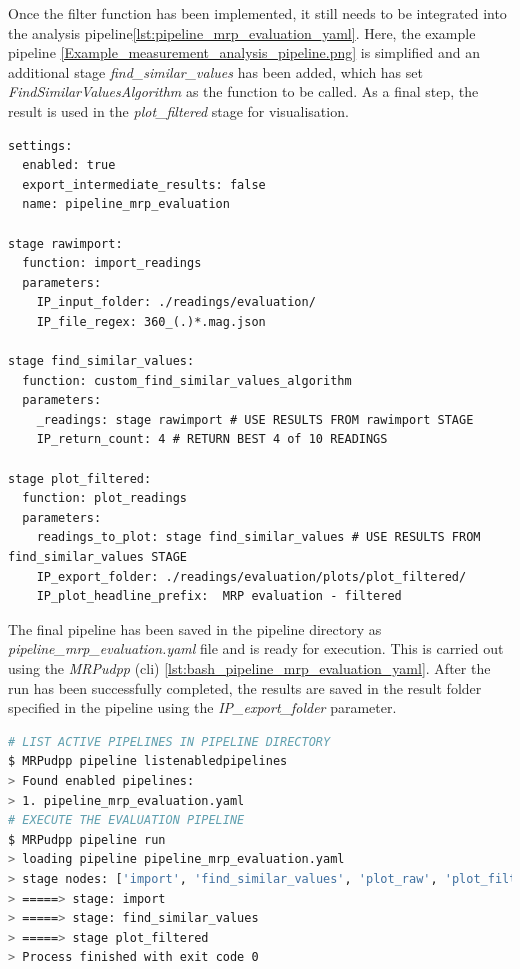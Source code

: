 Once the filter function has been implemented, it still needs to be
integrated into the analysis
pipeline\ref{lst:pipeline_mrp_evaluation_yaml}. Here, the example
pipeline \ref{Example_measurement_analysis_pipeline.png} is simplified
and an additional stage \emph{find\_similar\_values} has been added,
which has set \emph{FindSimilarValuesAlgorithm} as the function to be
called. As a final step, the result is used in the \emph{plot\_filtered}
stage for visualisation.

\begin{lstlisting}[caption={User defined processing pipeline using custom implemented filter algorithm}, label=lst:pipeline_mrp_evaluation_yaml]
settings:
  enabled: true
  export_intermediate_results: false
  name: pipeline_mrp_evaluation

stage rawimport:
  function: import_readings
  parameters:
    IP_input_folder: ./readings/evaluation/
    IP_file_regex: 360_(.)*.mag.json

stage find_similar_values:
  function: custom_find_similar_values_algorithm
  parameters:
    _readings: stage rawimport # USE RESULTS FROM rawimport STAGE
    IP_return_count: 4 # RETURN BEST 4 of 10 READINGS

stage plot_filtered:
  function: plot_readings
  parameters:
    readings_to_plot: stage find_similar_values # USE RESULTS FROM find_similar_values STAGE
    IP_export_folder: ./readings/evaluation/plots/plot_filtered/
    IP_plot_headline_prefix:  MRP evaluation - filtered
\end{lstlisting}

The final pipeline has been saved in the pipeline directory as
\emph{pipeline\_mrp\_evaluation.yaml} file and is ready for execution.
This is carried out using the \emph{MRPudpp} (cli)
\ref{lst:bash_pipeline_mrp_evaluation_yaml}. After the run has been
successfully completed, the results are saved in the result folder
specified in the pipeline using the \emph{IP\_export\_folder} parameter.

\begin{lstlisting}[language=bash, caption={Bash result log of evaluation pipeline run}, label=lst:bash_pipeline_mrp_evaluation_yaml]
# LIST ACTIVE PIPELINES IN PIPELINE DIRECTORY 
$ MRPudpp pipeline listenabledpipelines
> Found enabled pipelines:
> 1. pipeline_mrp_evaluation.yaml
# EXECUTE THE EVALUATION PIPELINE
$ MRPudpp pipeline run
> loading pipeline pipeline_mrp_evaluation.yaml
> stage nodes: ['import', 'find_similar_values', 'plot_raw', 'plot_filtered']
> =====> stage: import 
> =====> stage: find_similar_values 
> =====> stage plot_filtered 
> Process finished with exit code 0
\end{lstlisting}

